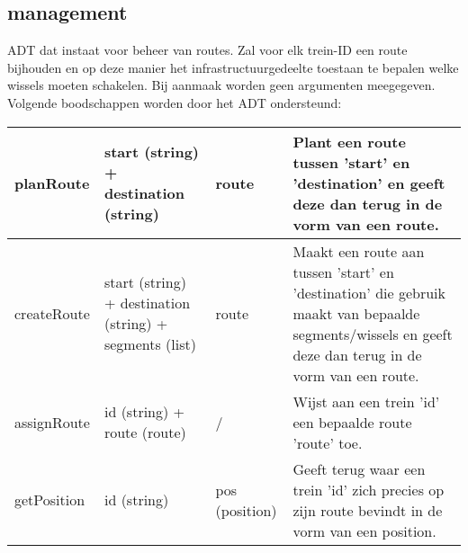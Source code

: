 \documentclass{article}
\begin{document}
\subsection{management}
ADT dat instaat voor beheer van routes. Zal voor elk trein-ID een route bijhouden en op deze manier het infrastructuurgedeelte toestaan te bepalen welke wissels moeten schakelen. Bij aanmaak worden geen argumenten meegegeven.
Volgende boodschappen worden door het ADT ondersteund:
\begin{center}
    \begin{tabular}{ | l | p{4cm} | l | p{8cm} |}
    \hline
    planRoute & start (string) + destination (string) & route & Plant een route tussen 'start' en 'destination' en geeft deze dan terug in de vorm van een route. \\ \hline
    createRoute & start (string) + destination (string) + segments (list) & route & Maakt een route aan tussen 'start' en 'destination' die gebruik maakt van bepaalde segments/wissels en geeft deze dan terug in de vorm van een route. \\ \hline
    assignRoute & id (string) + route (route) & / & Wijst aan een trein 'id' een bepaalde route 'route' toe. \\ \hline
    getPosition & id (string) & pos (position) & Geeft terug waar een trein 'id' zich precies op zijn route bevindt in de vorm van een position. \\ \hline
    \end{tabular}
\end{center}
\end{document}
